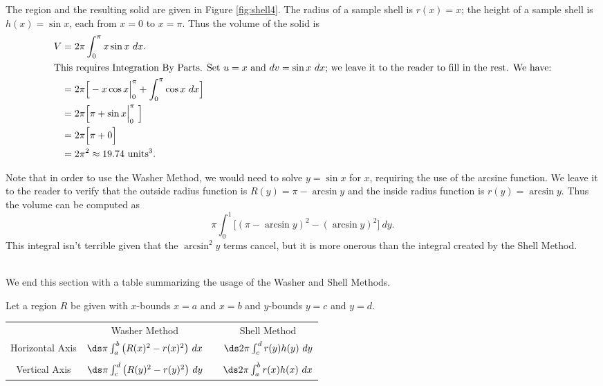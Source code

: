 {The region and the resulting solid are given in Figure \ref{fig:shell4}.
The radius of a sample shell is $r(x) = x$; the height of a sample shell is $h(x) = \sin x$, each from $x=0$ to $x=\pi$. Thus the volume of the solid is 
\begin{align*}
V &=	2\pi\int_0^{\pi} x\sin x\ dx. \\
\intertext{This requires Integration By Parts. Set $u=x$ and $dv=\sin x\ dx$; we leave it to the reader to fill in the rest. We have:}
	&= 2\pi\Big[-x\cos x\Big|_0^{\pi} +\int_0^{\pi}\cos x\ dx \Big] \\
	&= 2\pi\Big[\pi + \sin x \Big|_0^{\pi}\ \Big] \\
	&= 2\pi\Big[\pi + 0 \Big] \\
	&= 2\pi^2 \approx 19.74 \ \text{units}^3.
	\end{align*}

Note that in order to use the Washer Method, we would need to solve $y=\sin x$ for $x$, requiring the use of the arcsine function. We leave it to the reader to verify that the outside radius function is $R(y) = \pi-\arcsin y$ and the inside radius function is $r(y)=\arcsin y$. Thus the volume can be computed as $$\pi\int_0^1 \Big[ (\pi-\arcsin y)^2-(\arcsin y)^2\Big]\ dy.$$	This integral isn't terrible given that the $\arcsin^2 y$ terms cancel, but it is more onerous than the integral created by the Shell Method.
}\\

We end this section with a table summarizing the usage of the Washer and Shell Methods.

{Let a region $R$ be given with $x$-bounds $x=a$ and $x=b$ and $y$-bounds $y=c$ and $y=d$.
\vskip 5pt
\begin{tabular}{cccc}
 		& Washer Method & & Shell Method \rule[-10pt]{0pt}{10pt} \\
 \parbox{50pt}{\centering Horizontal Axis}  & $\ds \pi\int_a^b \big(R(x)^2-r(x)^2\big)\ dx$ & & $\ds 2\pi\int_c^d r(y)h(y)\ dy$ \\ \\
 \parbox{40pt}{\centering Vertical Axis} &  $\ds\pi \int_c^d\big(R(y)^2-r(y)^2\big)\ dy$ & & $\ds 2\pi\int_a^b r(x)h(x)\ dx$
 \end{tabular}
 }
 
